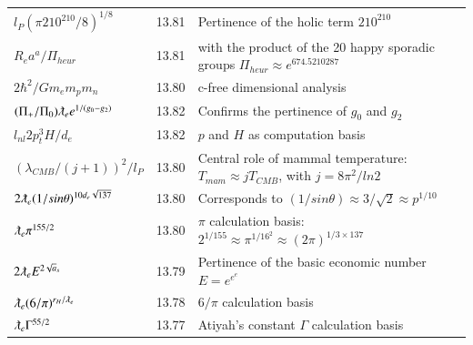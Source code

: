\documentclass[a4paper,9pt]{article}
\begin{document}
\begin{table}
\begin{tabular}{lll}
  
  $ l_{P} (\pi 210^{210}/8)^{1/8}$  & 13.81    & Pertinence of the holic term $210^{210}$  \\
  
  
  
  
  
  
  
 
 $R_e a^a/\Pi_{heur}$  & 13.81    & with the product of the 20 happy sporadic groups $\Pi_{heur}\approx e^{674.5210287}$  \\
 


$ 2\hbar^2/Gm_em_pm_n $ & 13.80 & c-free dimensional analysis \cite{Sanchez4}  \\
 
 $(\Pi_+/\Pi_0) \lambdabar_{e} e^{1/(g_0-g_2)}$ & 13.82 & Confirms the pertinence of $g_0$ and $g_2$  \\
 
 $l_{nl}2p_t^3H/d_e $ & 13.82 & $p$ and $H$ as computation basis  \\

 $ (\lambda_{CMB}/(j+1))^2/l_P$ & 13.80 & Central role of mammal temperature: $T_{mam}\approx j T_{CMB}$, with $j = 8\pi^2/ln2$ \\
 
  $ 2 \lambdabar_{e} (1/sin\theta)^{10d_e\sqrt {137}} $ & 13.80 & Corresponds to $(1/sin\theta) \approx 3/\sqrt2 \approx p^{1/10}$   \\
  
  $ \lambdabar_{e} \pi^{155/2}$ & 13.80 & $\pi$ calculation basis: $2^{1/155} \approx \pi^{1/16^2}  \approx (2\pi)^{1/3\times 137} $  \\
  
  $ 2\lambdabar_{e} E^{2\sqrt a_s}$ & 13.79 & Pertinence of the basic economic number $E = e^{e^e}$  \\
  
  
  $ \lambdabar_{e} (6/\pi)^{r_H/\lambdabar_e}$ & 13.78 & $6/\pi$ calculation basis   \\  
  
  
  
$ \lambdabar_{e} \Gamma^{55/2}$ & 13.77 & Atiyah's constant $\Gamma$ calculation basis   \\  
  
  
 
 

\end{tabular}
\end{table}
\end{document}
